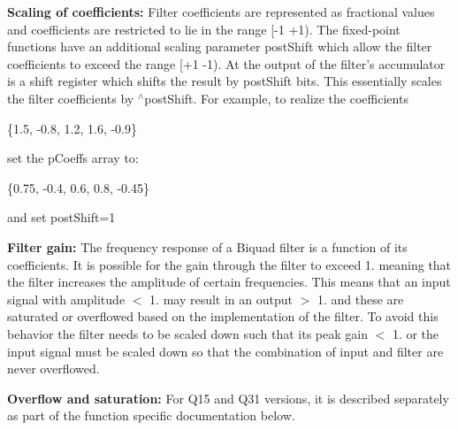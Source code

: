 \begin{DoxyParagraph}{}
{\bfseries Scaling of coefficients\-: } Filter coefficients are represented as fractional values and coefficients are restricted to lie in the range {\ttfamily \mbox{[}-\/1 +1)}. The fixed-\/point functions have an additional scaling parameter {\ttfamily post\-Shift} which allow the filter coefficients to exceed the range {\ttfamily \mbox{[}+1 -\/1)}. At the output of the filter's accumulator is a shift register which shifts the result by {\ttfamily post\-Shift} bits.  This essentially scales the filter coefficients by {$^\wedge$post\-Shift}. For example, to realize the coefficients 
\begin{DoxyPre}    
   \{1.5, -0.8, 1.2, 1.6, -0.9\}    
\end{DoxyPre}
 set the p\-Coeffs array to\-: 
\begin{DoxyPre}    
   \{0.75, -0.4, 0.6, 0.8, -0.45\}    
\end{DoxyPre}
 and set {\ttfamily post\-Shift=1}
\end{DoxyParagraph}
\begin{DoxyParagraph}{}
{\bfseries Filter gain\-: } The frequency response of a Biquad filter is a function of its coefficients. It is possible for the gain through the filter to exceed 1. meaning that the filter increases the amplitude of certain frequencies. This means that an input signal with amplitude $<$ 1. may result in an output $>$ 1. and these are saturated or overflowed based on the implementation of the filter. To avoid this behavior the filter needs to be scaled down such that its peak gain $<$ 1. or the input signal must be scaled down so that the combination of input and filter are never overflowed.
\end{DoxyParagraph}
\begin{DoxyParagraph}{}
{\bfseries Overflow and saturation\-: } For Q15 and Q31 versions, it is described separately as part of the function specific documentation below. 
\end{DoxyParagraph}


